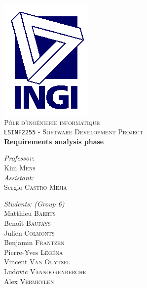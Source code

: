 \begin{titlepage}

\rm %

\begin{center}

\includegraphics[scale=.5]{ingi.png}\\[1cm]

\textsc{\LARGE Pôle d'ingénierie informatique}\\[1.5cm]

\textsc{\Large \texttt{LSINF2255} - Software Development Project}\\[0.5cm]


\vspace{3.5cm}
{ \huge \bfseries Requirements analysis phase\vspace{0.8cm}}

\vspace{3.5cm}

\begin{minipage}{0.4\textwidth}
\begin{flushleft} \large
\emph{Professor:}\\
	Kim \textsc{Mens}\\
\vspace{1cm}
\emph{Assistant:}\\
	Sergio \textsc{Castro Mejia} %
\end{flushleft}
\end{minipage}
\begin{minipage}{0.4\textwidth}
\begin{flushright} \large
\emph{Students: (Group 6)} \\
	Matthieu \textsc{Baerts}\\
	Benoît \textsc{Baufays}\\
	Julien \textsc{Colmonts}\\
	Benjamin \textsc{Frantzen}\\
	Pierre-Yves \textsc{Légéna}\\
	Vincent \textsc{Van Ouytsel}\\
	Ludovic \textsc{Vannoorenberghe}\\
	Alex \textsc{Vermeylen}
\end{flushright}
\end{minipage}


\end{center}
\end{titlepage}
